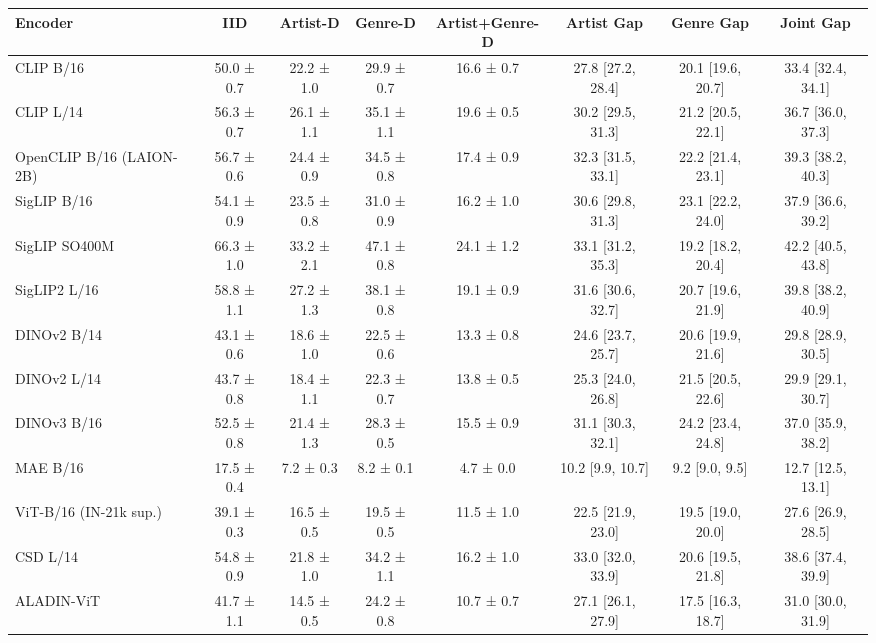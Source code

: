 \begin{tabular}{lccccccc}
\toprule
Encoder & IID & Artist-D & Genre-D & Artist+Genre-D & Artist Gap & Genre Gap & Joint Gap \\
\midrule
CLIP B/16 & 50.0 ± 0.7 & 22.2 ± 1.0 & 29.9 ± 0.7 & 16.6 ± 0.7 & 27.8 [27.2, 28.4] & 20.1 [19.6, 20.7] & 33.4 [32.4, 34.1] \\
CLIP L/14 & 56.3 ± 0.7 & 26.1 ± 1.1 & 35.1 ± 1.1 & 19.6 ± 0.5 & 30.2 [29.5, 31.3] & 21.2 [20.5, 22.1] & 36.7 [36.0, 37.3] \\
OpenCLIP B/16 (LAION-2B) & 56.7 ± 0.6 & 24.4 ± 0.9 & 34.5 ± 0.8 & 17.4 ± 0.9 & 32.3 [31.5, 33.1] & 22.2 [21.4, 23.1] & 39.3 [38.2, 40.3] \\
SigLIP B/16 & 54.1 ± 0.9 & 23.5 ± 0.8 & 31.0 ± 0.9 & 16.2 ± 1.0 & 30.6 [29.8, 31.3] & 23.1 [22.2, 24.0] & 37.9 [36.6, 39.2] \\
SigLIP SO400M & 66.3 ± 1.0 & 33.2 ± 2.1 & 47.1 ± 0.8 & 24.1 ± 1.2 & 33.1 [31.2, 35.3] & 19.2 [18.2, 20.4] & 42.2 [40.5, 43.8] \\
SigLIP2 L/16 & 58.8 ± 1.1 & 27.2 ± 1.3 & 38.1 ± 0.8 & 19.1 ± 0.9 & 31.6 [30.6, 32.7] & 20.7 [19.6, 21.9] & 39.8 [38.2, 40.9] \\
DINOv2 B/14 & 43.1 ± 0.6 & 18.6 ± 1.0 & 22.5 ± 0.6 & 13.3 ± 0.8 & 24.6 [23.7, 25.7] & 20.6 [19.9, 21.6] & 29.8 [28.9, 30.5] \\
DINOv2 L/14 & 43.7 ± 0.8 & 18.4 ± 1.1 & 22.3 ± 0.7 & 13.8 ± 0.5 & 25.3 [24.0, 26.8] & 21.5 [20.5, 22.6] & 29.9 [29.1, 30.7] \\
DINOv3 B/16 & 52.5 ± 0.8 & 21.4 ± 1.3 & 28.3 ± 0.5 & 15.5 ± 0.9 & 31.1 [30.3, 32.1] & 24.2 [23.4, 24.8] & 37.0 [35.9, 38.2] \\
MAE B/16 & 17.5 ± 0.4 & 7.2 ± 0.3 & 8.2 ± 0.1 & 4.7 ± 0.0 & 10.2 [9.9, 10.7] & 9.2 [9.0, 9.5] & 12.7 [12.5, 13.1] \\
ViT-B/16 (IN-21k sup.) & 39.1 ± 0.3 & 16.5 ± 0.5 & 19.5 ± 0.5 & 11.5 ± 1.0 & 22.5 [21.9, 23.0] & 19.5 [19.0, 20.0] & 27.6 [26.9, 28.5] \\
CSD L/14 & 54.8 ± 0.9 & 21.8 ± 1.0 & 34.2 ± 1.1 & 16.2 ± 1.0 & 33.0 [32.0, 33.9] & 20.6 [19.5, 21.8] & 38.6 [37.4, 39.9] \\
ALADIN-ViT & 41.7 ± 1.1 & 14.5 ± 0.5 & 24.2 ± 0.8 & 10.7 ± 0.7 & 27.1 [26.1, 27.9] & 17.5 [16.3, 18.7] & 31.0 [30.0, 31.9] \\
\bottomrule
\end{tabular}
